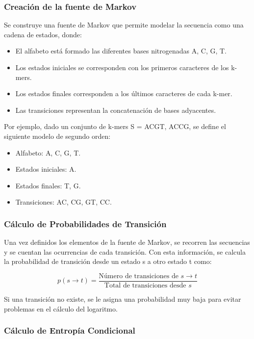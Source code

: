 \documentclass[11pt,spanish,listoffigures,listoftables]{tfgetsinf}
\begin{document}
\subsubsection{Creación de la fuente de Markov}

Se construye una fuente de Markov que permite modelar la secuencia como una cadena de estados, donde:

\begin{itemize}
   \item El alfabeto está formado las diferentes bases nitrogenadas {A, C, G, T}.
   \item Los estados iniciales se corresponden con los primeros caracteres de los k-mers.
   \item Los estados finales corresponden a los últimos caracteres de cada k-mer.
   \item Las transiciones representan la concatenación de bases adyacentes.
\end{itemize}


Por ejemplo, dado un conjunto de k-mers S = ACGT, ACCG, se define el siguiente modelo de segundo orden:

\begin{itemize}
   \item Alfabeto: {A, C, G, T}.
   \item Estados iniciales: {A}.
   \item Estados finales: {T, G}.
   \item Transiciones: {AC, CG, GT, CC}.
\end{itemize}


\subsubsection{Cálculo de Probabilidades de Transición}
Una vez definidos los elementos de la fuente de Markov, se recorren las secuencias y se cuentan las ocurrencias de cada transición. Con esta información, se calcula la probabilidad de transición desde un estado s a otro estado t como:

\[
p(s \to t) = \frac{\text{Número de transiciones de } s \to t}{\text{Total de transiciones desde } s}
\]

Si una transición no existe, se le asigna una probabilidad muy baja para evitar problemas en el cálculo del logaritmo.

\subsubsection{Cálculo de Entropía Condicional}
\end{document}
